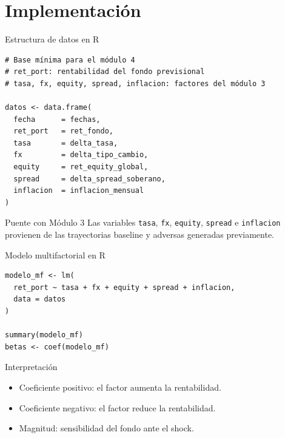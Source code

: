 \documentclass[aspectratio=169,11pt]{beamer}
\begin{document}
\section{Implementación}

\begin{frame}[fragile]{Estructura de datos en R}
\begin{lstlisting}[style=Rstyle]
# Base mínima para el módulo 4
# ret_port: rentabilidad del fondo previsional
# tasa, fx, equity, spread, inflacion: factores del módulo 3

datos <- data.frame(
  fecha      = fechas,
  ret_port   = ret_fondo,
  tasa       = delta_tasa,
  fx         = delta_tipo_cambio,
  equity     = ret_equity_global,
  spread     = delta_spread_soberano,
  inflacion  = inflacion_mensual
)
\end{lstlisting}

\begin{block}{Puente con Módulo 3}
Las variables \texttt{tasa}, \texttt{fx}, \texttt{equity}, \texttt{spread} e \texttt{inflacion} provienen de las trayectorias baseline y adversas generadas previamente.
\end{block}
\end{frame}

\begin{frame}[fragile]{Modelo multifactorial en R}
\begin{lstlisting}[style=Rstyle]
modelo_mf <- lm(
  ret_port ~ tasa + fx + equity + spread + inflacion,
  data = datos
)

summary(modelo_mf)
betas <- coef(modelo_mf)
\end{lstlisting}

\begin{block}{Interpretación}
\begin{itemize}
  \item Coeficiente positivo: el factor aumenta la rentabilidad.
  \item Coeficiente negativo: el factor reduce la rentabilidad.
  \item Magnitud: sensibilidad del fondo ante el shock.
\end{itemize}
\end{block}
\end{frame}
\end{document}
